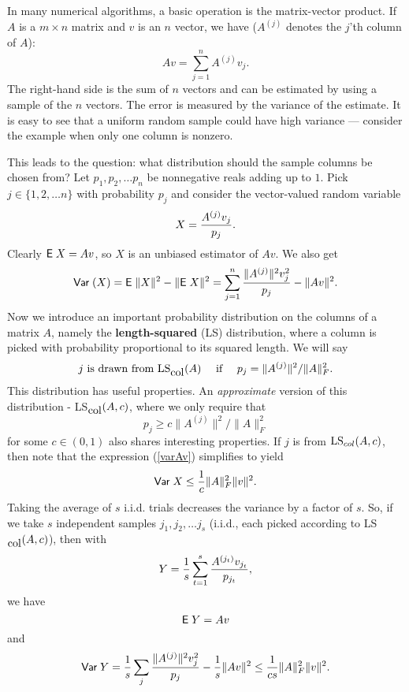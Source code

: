 \documentclass{book}
\numberwithin{exercise}{chapter}
\begin{document}
In many numerical algorithms, a basic operation is the matrix-vector product. If $A$ is a $m\times n$
matrix and $v$ is an $n$ vector, we have ($A^{(j)}$ denotes the $j$'th column of $A$):
$$Av=\sum_{j=1}^n A^{(j)}v_j.$$
The right-hand side is the sum of $n$ vectors and can be estimated by using a sample of the $n$ vectors. The error is measured by the variance
of the estimate. It is easy to see that a uniform random sample could have high variance ---
consider the example when only one column is nonzero.

This leads to the question: what distribution should the sample columns be chosen from?
Let $p_1,p_2,\ldots p_n$ be nonnegative reals adding up to $1$. Pick $j\in \{ 1,2,\ldots n\}$ with
probability $p_j$ and consider the vector-valued random variable
$$X={A^{(j)}v_j\over p_j}.$$
Clearly $\hbox{{\sf E}\;} X=Av$, so $X$ is an unbiased estimator of $Av$. We also get
\begin{equation}\label{varAv}
\hbox{\sf Var\;} (X) = \hbox{{\sf E}\;} \|X\|^2-\|\hbox{{\sf E}\;} X\|^2 = \sum_{j=1}^n {\|A^{(j)}\|^2v_j^2\over p_j} - \|Av\|^2.
\end{equation}
Now we introduce an important probability distribution on the columns of a matrix $A$, namely
the {\bf length-squared} (LS) distribution, where a column is picked with probability proportional
to its squared length. We will say
$$j \mbox{ is drawn from } \hbox{LS}_{\hbox{col}}(A)\quad \hbox{   if   } \quad p_j=\|A^{(j)}\|^2/\|A\|_F^2.$$
This distribution has useful properties.
An {\em approximate} version of this distribution - LS$_{\hbox{col}}(A,c)$, where we only require
that $$p_j\geq c\|A^{(j)}\|^2/\|A\|_F^2$$
for some $c\in (0,1)$
also shares interesting properties.
If $j$ is from $\hbox{LS}_{col}(A,c)$, then note that the expression (\ref{varAv}) simplifies to
yield
\[
\hbox{\sf Var\;} X\leq \frac{1}{c}\|A\|_F^2\|v\|^2.
\]
Taking the average of $s$ i.i.d. trials
decreases the variance by a factor of $s$.
So, if we take $s$ independent samples
$j_1,j_2,\ldots j_s$ (i.i.d., each picked according to LS$_{\hbox{col}}(A,c)$), then with
\[
Y={1\over s}\sum_{t=1}^s {A^{(j_t)}v_{j_t}\over p_{j_t}},
\]
we have
\[
\hbox{{\sf E}\;} Y=Av
\]
and
\begin{eqnarray}\label{300}
\hbox{\sf Var\;} Y={1\over s} \sum_j {\|A^{(j)}\|^2v_j^2\over p_j}-{1\over s}\|Av\|^2
\leq {1\over cs}\|A\|_F^2\|v\|^2.
\end{eqnarray}
\end{document}
